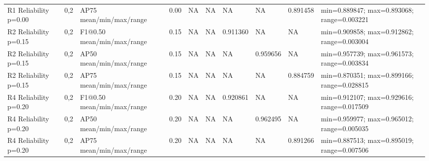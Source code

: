{\begin{tabular}{@{}llllllllll@{}}
R1 Reliability p=0.00 & 0,2 & AP75 mean/min/max/range & 0.00 & NA & NA & NA & NA & 0.891458 & min=0.889847; max=0.893068; range=0.003221 \\
R2 Reliability p=0.15 & 0,2 & F1@0.50 mean/min/max/range & 0.15 & NA & NA & 0.911360 & NA & NA & min=0.909858; max=0.912862; range=0.003004 \\
R2 Reliability p=0.15 & 0,2 & AP50 mean/min/max/range & 0.15 & NA & NA & NA & 0.959656 & NA & min=0.957739; max=0.961573; range=0.003834 \\
R2 Reliability p=0.15 & 0,2 & AP75 mean/min/max/range & 0.15 & NA & NA & NA & NA & 0.884759 & min=0.870351; max=0.899166; range=0.028815 \\
R4 Reliability p=0.20 & 0,2 & F1@0.50 mean/min/max/range & 0.20 & NA & NA & 0.920861 & NA & NA & min=0.912107; max=0.929616; range=0.017509 \\
R4 Reliability p=0.20 & 0,2 & AP50 mean/min/max/range & 0.20 & NA & NA & NA & 0.962495 & NA & min=0.959977; max=0.965012; range=0.005035 \\
R4 Reliability p=0.20 & 0,2 & AP75 mean/min/max/range & 0.20 & NA & NA & NA & NA & 0.891266 & min=0.887513; max=0.895019; range=0.007506 \\
\bottomrule
\end{tabular}%
}
